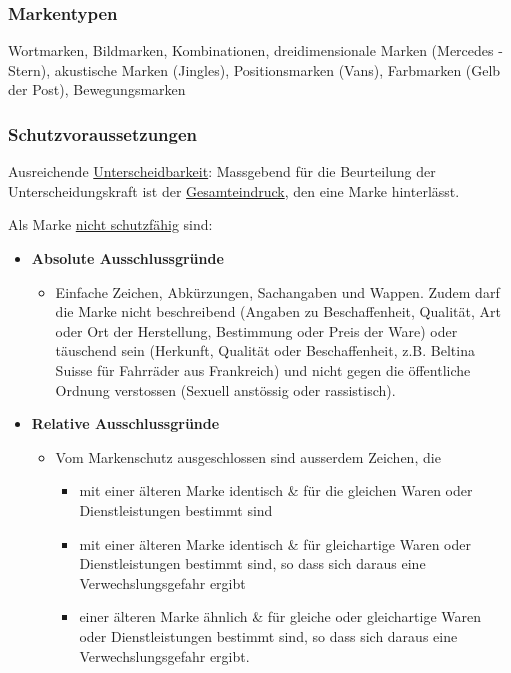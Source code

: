 \subsubsection{Markentypen}
Wortmarken, Bildmarken, Kombinationen, dreidimensionale Marken (Mercedes - Stern), akustische Marken (Jingles), Positionsmarken (Vans), Farbmarken (Gelb der Post), Bewegungsmarken

\subsubsection{Schutzvoraussetzungen}
Ausreichende \underline{Unterscheidbarkeit}: Massgebend für die Beurteilung der Unterscheidungskraft ist der \underline{Gesamteindruck}, den eine Marke hinterlässt.

Als Marke \underline{nicht schutzfähig} sind:
\begin{itemize}
    \item \textbf{Absolute Ausschlussgründe}
    \begin{itemize}
        \item Einfache Zeichen, Abkürzungen, Sachangaben und Wappen. Zudem darf die Marke nicht beschreibend (Angaben zu Beschaffenheit, Qualität, Art oder Ort der Herstellung, Bestimmung oder Preis der Ware) oder täuschend sein (Herkunft, Qualität oder Beschaffenheit, z.B. Beltina Suisse für Fahrräder aus Frankreich) und nicht gegen die öffentliche Ordnung verstossen (Sexuell anstössig oder rassistisch).
    \end{itemize}
    \item \textbf{Relative Ausschlussgründe}
    \begin{itemize}
        \item Vom Markenschutz ausgeschlossen sind ausserdem Zeichen, die
        \begin{itemize}
            \item mit einer älteren Marke identisch \& für die gleichen Waren oder Dienstleistungen bestimmt sind
            \item mit einer älteren Marke identisch \& für gleichartige Waren oder Dienstleistungen bestimmt sind, so dass sich daraus eine Verwechslungsgefahr ergibt
            \item einer älteren Marke ähnlich \& für gleiche oder gleichartige Waren oder Dienstleistungen bestimmt sind, so dass sich daraus eine Verwechslungsgefahr ergibt.
        \end{itemize}
    \end{itemize}
\end{itemize}

